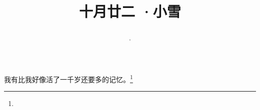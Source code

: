\title{\date[d=22,m=11,y=2024][year:cn-y,年,month:cn,day:cn,日,·,weekday]·十月廿二 ·小雪}
我有比我好像活了一千岁还要多的记忆。\footnote{ }

